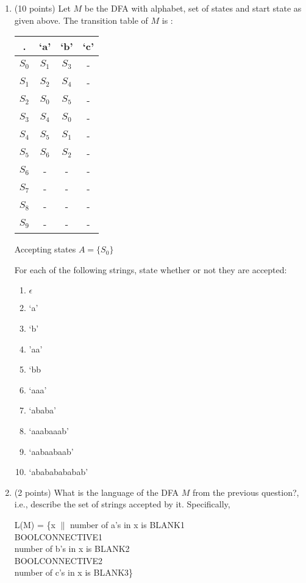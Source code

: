 \documentclass[10pt]{article}
\begin{document}
\begin{enumerate}
    \item (10 points) Let $M$ be the DFA with alphabet, set of states and start state as given above. The transition table of $M$ is :
   \begin{center}
      \begin{tabular}{ |c|c|c|c| } 
        \hline
 .  & `a' & `b' & `c' \\\hline \hline
 $S_0$ & $S_1$ & $S_3$ & -\\ \hline
 $S_1$ & $S_2$ & $S_4$ & - \\ \hline
 $S_2$ & $S_0$ & $S_5$ & - \\ \hline
 $S_3$ & $S_4$ & $S_0$ & - \\ \hline
 $S_4$ & $S_5$ & $S_1$ & - \\ \hline
 $S_5$ & $S_6$ & $S_2$ & - \\ \hline
 $S_6$ & - & - & - \\ \hline
 $S_7$ & - & - & - \\ \hline
 $S_8$ & - & - & - \\ \hline
 $S_9$ & - & - & - \\ \hline
\end{tabular}
\end{center}
Accepting states $A = \{S_0\}$

For each of the following strings, state whether or not they are accepted:
\begin{enumerate}
    \item $\epsilon$
    \item `a'
    \item `b'
    \item  'aa'
    \item `bb
    \item `aaa'
    \item `ababa'
    \item `aaabaaab'
    \item `aabaabaab'
    \item `abababababab'
\end{enumerate}

\newpage 
\item (2 points) What is the language of the DFA $M$ from the previous question?, i.e., describe the set of strings accepted by it.
Specifically, 
\begin{center}
L(M) = \{x $\|$ number of a's in x is BLANK1\\ BOOLCONNECTIVE1 \\  number of b's in x is BLANK2\\ BOOLCONNECTIVE2\\ number of c's in x is BLANK3\}
\end{center}


\end{enumerate}
\end{document}
